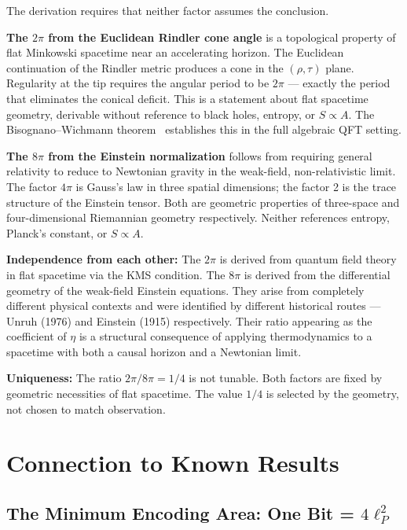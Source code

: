 \documentclass[12pt,a4paper]{article}
\begin{document}
The derivation requires that neither factor assumes the conclusion.

\textbf{The $2\pi$ from the Euclidean Rindler cone angle} is a
topological property of flat Minkowski spacetime near an accelerating
horizon. The Euclidean continuation of the Rindler metric produces a
cone in the $(\rho, \tau)$ plane. Regularity at the tip requires the
angular period to be $2\pi$ --- exactly the period that eliminates the
conical deficit. This is a statement about flat spacetime geometry,
derivable without reference to black holes, entropy, or $S \propto A$.
The Bisognano--Wichmann theorem~\citep{Bisognano1976} establishes this
in the full algebraic QFT setting.

\textbf{The $8\pi$ from the Einstein normalization} follows from
requiring general relativity to reduce to Newtonian gravity in the
weak-field, non-relativistic limit. The factor $4\pi$ is Gauss's
law in three spatial dimensions; the factor 2 is the trace structure
of the Einstein tensor. Both are geometric properties of three-space
and four-dimensional Riemannian geometry respectively. Neither
references entropy, Planck's constant, or $S \propto A$.

\textbf{Independence from each other:} The $2\pi$ is derived from
quantum field theory in flat spacetime via the KMS condition. The
$8\pi$ is derived from the differential geometry of the weak-field
Einstein equations. They arise from completely different physical
contexts and were identified by different historical routes --- Unruh
(1976) and Einstein (1915) respectively. Their ratio appearing as the
coefficient of $\eta$ is a structural consequence of applying
thermodynamics to a spacetime with both a causal horizon and a
Newtonian limit.

\textbf{Uniqueness:} The ratio $2\pi/8\pi = 1/4$ is not tunable.
Both factors are fixed by geometric necessities of flat spacetime.
The value $1/4$ is selected by the geometry, not chosen to match
observation.

\section{Connection to Known Results}
\label{sec:connections}

\subsection{The Minimum Encoding Area: One Bit = $4\ell_P^2$}
\end{document}
